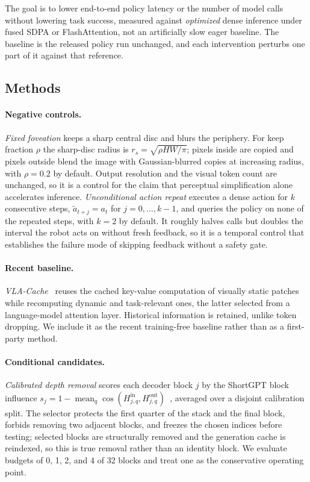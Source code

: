 The goal is to lower end-to-end policy latency or the number of model calls
without lowering task success, measured against \emph{optimized} dense
inference under fused SDPA or FlashAttention, not an artificially slow eager
baseline. The baseline is the released policy run unchanged, and each
intervention perturbs one part of it against that reference.

\subsection{Methods}

\paragraph{Negative controls.} \emph{Fixed foveation} keeps a sharp central
disc and blurs the periphery. For keep fraction $\rho$ the sharp-disc radius is
$r_s = \sqrt{\rho HW/\pi}$; pixels inside are copied and pixels outside blend
the image with Gaussian-blurred copies at increasing radius, with $\rho=0.2$ by
default. Output resolution and the visual token count are unchanged, so it is a
control for the claim that perceptual simplification alone accelerates
inference. \emph{Unconditional action repeat} executes a dense action for $k$
consecutive steps, $\tilde a_{t+j}=a_t$ for $j=0,\dots,k-1$, and queries the
policy on none of the repeated steps, with $k=2$ by default. It roughly halves
calls but doubles the interval the robot acts on without fresh feedback, so it
is a temporal control that establishes the failure mode of skipping feedback
without a safety gate.

\paragraph{Recent baseline.} \emph{VLA-Cache}~\cite{vlacache} reuses the cached
key-value computation of visually static patches while recomputing dynamic and
task-relevant ones, the latter selected from a language-model attention layer.
Historical information is retained, unlike token dropping. We include it as the
recent training-free baseline rather than as a first-party method.

\paragraph{Conditional candidates.} \emph{Calibrated depth removal} scores each
decoder block $j$ by the ShortGPT block influence $s_j = 1 - \operatorname{mean}_q
\cos(H^{\mathrm{in}}_{j,q}, H^{\mathrm{out}}_{j,q})$~\cite{shortgpt}, averaged
over a disjoint calibration split. The selector protects the first quarter of
the stack and the final block, forbids removing two adjacent blocks, and freezes
the chosen indices before testing; selected blocks are structurally removed and
the generation cache is reindexed, so this is true removal rather than an
identity block. We evaluate budgets of 0, 1, 2, and 4 of 32 blocks and treat one
as the conservative operating point.

